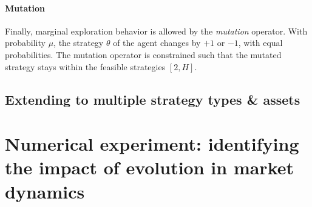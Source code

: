 \documentclass{article}
\begin{document}
\paragraph{Mutation} Finally, marginal exploration behavior is allowed by the \textit{mutation} operator. With probability $\mu$, the strategy $\theta$ of the agent changes by $+1$ or $-1$, with equal probabilities. The mutation operator is constrained such that the mutated strategy stays within the feasible strategies $[2, H]$. 



\subsection{Extending to multiple strategy types \& assets}

\section{Numerical experiment: identifying the impact of evolution in market dynamics}




\end{document}
